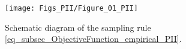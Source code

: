 \begin{figure}
	\centering
	\texttt{[image: Figs\_PII/Figure\_01\_PII]}
	\caption{\label{fig:schematic_ruleRAMISm_PII} Schematic diagram of the sampling rule \eqref{eq_subsec_ObjectiveFunction_empirical_PII}. }
\end{figure}




